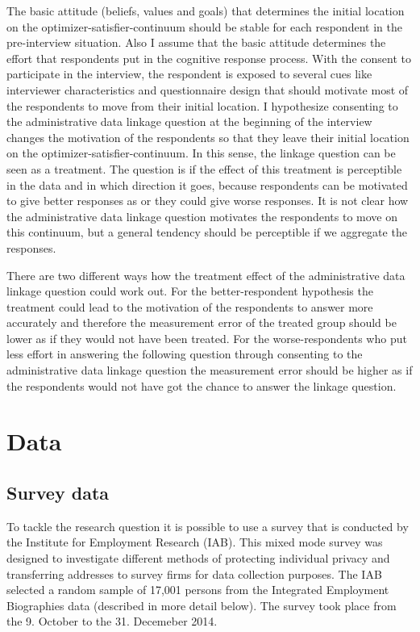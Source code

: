 The basic attitude (beliefs, values and goals) that determines the initial location on the optimizer-satisfier-continuum should be stable for each respondent in the pre-interview situation. Also I assume that the basic attitude determines the effort that respondents put in the cognitive response process. With the consent to participate in the interview, the respondent is exposed to several cues like interviewer characteristics and questionnaire design that should motivate most of the respondents to move from their initial location. I hypothesize consenting to the administrative data linkage question at the beginning of the interview changes the motivation of the respondents so that they leave their initial location on the optimizer-satisfier-continuum. In this sense, the linkage question can be seen as a treatment. The question is if the effect of this treatment is perceptible in the data and in which direction it goes, because respondents can be motivated to give better responses as or they could give worse responses. It is not clear how the administrative data linkage question motivates the respondents to move on this continuum, but a general tendency should be perceptible if we aggregate the responses.
	


There are two different ways how the treatment effect of the administrative data linkage question could work out. For the better-respondent hypothesis the treatment could lead to the motivation of the respondents to answer more accurately and therefore the measurement error of the treated group should be lower as if they would not have been treated. For the worse-respondents who put less effort in answering the following question through consenting to the administrative data linkage question the measurement error should be higher as if the respondents would not have got the chance to answer the linkage question.

\section{Data}
\subsection {Survey data}

To tackle the research question it is possible to use a survey that is conducted by the Institute for Employment Research (IAB). This mixed mode survey was designed to investigate different methods of protecting individual privacy and transferring addresses to survey firms for data collection purposes. The IAB selected a random sample of 17,001 persons from the Integrated Employment Biographies data (described in more detail below). The survey took place from the 9. October to the 31. Decemeber 2014.

